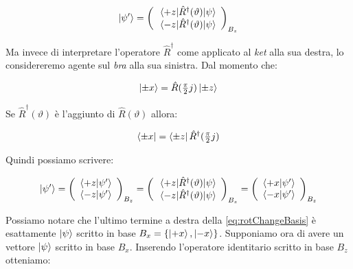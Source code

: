 	\begin{equation}
		\ket{\psi'} =
			\left ( \begin{array}{c}
				\mel{+z}{\hat{R}^\dagger(\vartheta)}{\psi} \\
				\mel{-z}{\hat{R}^\dagger(\vartheta)}{\psi}
			\end{array} \right )_{B_z}
	\end{equation}

Ma invece di interpretare l'operatore $\hat{R}^\dagger$ come applicato al \textit{ket} alla sua destra, lo considereremo agente sul \textit{bra} alla sua sinistra. Dal momento che:

	\begin{equation}
		\ket{\pm x} = \hat{R} ( \tfrac{\pi}{2} j ) \ket{\pm z}
	\end{equation}

Se $\hat{R}^\dagger(\vartheta)$ \`e l'aggiunto di $\hat{R} ( \vartheta )$ allora:
	
	\begin{equation}
		\bra{\pm x} = \bra{\pm z} \hat{R}^\dagger ( \tfrac{\pi}{2} j )
	\end{equation}

Quindi possiamo scrivere:

	\begin{equation} \label{eq:rotChangeBasis}
		\ket{\psi'} =
			\left ( \begin{array}{c}
				\braket{+z}{\psi'} \\
				\braket{-z}{\psi'} \\
			\end{array} \right )_{B_z} =
			\left ( \begin{array}{c}
				\mel{+z}{\hat{R}^\dagger(\vartheta)}{\psi} \\
				\mel{-z}{\hat{R}^\dagger(\vartheta)}{\psi}
			\end{array} \right )_{B_z} =
			\left ( \begin{array}{c}
				\braket{+x}{\psi'} \\
				\braket{-x}{\psi'} \\
			\end{array} \right )_{B_z}
	\end{equation}

Possiamo notare che l'ultimo termine a destra della \eqref{eq:rotChangeBasis} \`e esattamente $\ket{\psi}$ scritto in base $B_x = \{ \ket{+x}, \ket{-x} \}$. Supponiamo ora di avere un vettore $\ket{\psi}$ scritto in base $B_x$. Inserendo l'operatore identitario scritto in base $B_z$ otteniamo:

